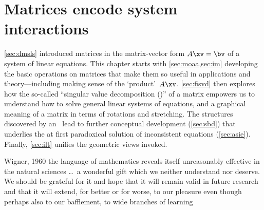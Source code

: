 
\chapter{Matrices encode system interactions}
\label{ch:m}

\minitoc




\autoref{sec:dmsls} introduced matrices in the matrix-vector form \(A\xv=\bv\) of a system of linear equations.
This chapter starts with \cref{sec:moaa,sec:im} developing the basic operations on matrices that make them so useful in applications and theory---including making sense of the `product'~\(A\xv\).
\autoref{sec:fisvd} then explores how the so-called ``singular value decomposition (\svd)'' of a matrix empowers us to understand how to solve general linear systems of equations, and a graphical meaning of a matrix in terms of rotations and stretching.
The structures discovered by an \svd\ lead to further conceptual development (\autoref{sec:sbd}) that underlies the at first paradoxical solution of inconsistent equations (\autoref{sec:asie}).
Finally, \autoref{sec:ilt} unifies the geometric views invoked.



\begin{quoted}{Wigner, 1960 \cite[p.3]{Mandelbrot1982}}
the language of mathematics reveals itself unreasonably effective in the natural sciences \ldots\ a wonderful gift which we neither understand nor deserve.  We should be grateful for it and hope that it will remain valid in future research and that it will extend, for better or for worse, to our pleasure even though perhaps also to our bafflement, to wide branches of learning
\end{quoted}



